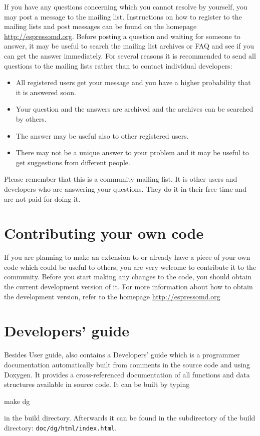 If you have any questions concerning \es which you cannot
resolve by yourself, you may post a message to
the mailing list. Instructions on how to register to the mailing
lists and post messages can be found on the homepage 
\url{http://espressomd.org}.
Before posting a question and waiting for someone to answer, 
it may be useful to search the mailing list archives or FAQ and 
see if you can get the answer immediately.
For several reasons it is recommended to send all questions 
to the mailing lists rather than to contact individual developers:
\begin{itemize}
  \item All registered users get your message and you have a higher 
  probability that it is answered soon.
  \item Your question and the answers are archived and the archives
  can be searched by others.
  \item The answer may be useful also to other registered users.
  \item There may not be a unique answer to your problem and it may 
  be useful to get suggestions from different people.
\end{itemize}

Please remember that this is a community mailing list. It is other
users and developers who are answering your questions. They do it
in their free time and are not paid for doing it.


\section{Contributing your own code}

If you are planning to make an extension to \es or 
already have a piece of your own code which could be useful 
to others, you are very welcome to contribute it to 
the community. 
Before you start making any changes to the code, you
should obtain the current development version of it.
For more information about how to obtain the
development version, refer to the homepage \url{http://espressomd.org}

\section{Developers' guide}
\label{sec:dg}

Besides User guide, \es also contains a Developers' guide
which is a programmer documentation automatically built
from comments in the source code and using Doxygen. 
It provides a cross-referenced documentation
of all functions and data structures available in \es source
code. It can be built by typing
\begin{code}
  make dg
\end{code}
in the build directory. Afterwards it can be found
in the subdirectory of the build directory: \texttt{doc/dg/html/index.html}.

